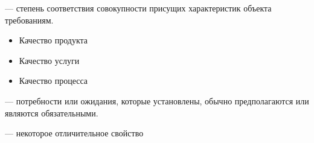 \documentclass[a4paper, 14pt]{extarticle}
\begin{document}
\begin{tcolorbox}
     --- степень соответствия совокупности присущих характеристик объекта требованиям.
\end{tcolorbox}
\begin{itemize}
    \item Качество продукта
    \item Качество услуги
    \item Качество процесса
\end{itemize}

 — потребности или ожидания, которые установлены, обычно предполагаются или являются обязательными.

 --- некоторое отличительное свойство
\end{document}
